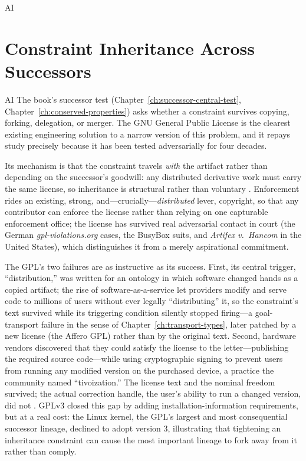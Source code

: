 \begin{refsection}
\begin{authbar}{AI}
\end{authbar}
\authbarneedspace
\section{Constraint Inheritance Across Successors}
\label{sec:appm-constraint-inheritance}
\begin{authbar}{AI}
The book's successor test (Chapter~\ref{ch:successor-central-test}, Chapter~\ref{ch:conserved-properties}) asks whether a constraint survives copying, forking, delegation, or merger.
The GNU General Public License is the clearest existing engineering solution to a narrow version of this problem, and it repays study precisely because it has been tested adversarially for four decades.

Its mechanism is that the constraint travels \emph{with} the artifact rather than depending on the successor's goodwill: any distributed derivative work must carry the same license, so inheritance is structural rather than voluntary \autocite{kelty2008twobits,weber2004successopensource}.
Enforcement rides an existing, strong, and---crucially---\emph{distributed} lever, copyright, so that any contributor can enforce the license rather than relying on one capturable enforcement office; the license has survived real adversarial contact in court (the German \emph{gpl-violations.org} cases, the BusyBox suits, and \emph{Artifex v.\ Hancom} in the United States), which distinguishes it from a merely aspirational commitment.

The GPL's two failures are as instructive as its success.
First, its central trigger, ``distribution,'' was written for an ontology in which software changed hands as a copied artifact; the rise of software-as-a-service let providers modify and serve code to millions of users without ever legally ``distributing'' it, so the constraint's text survived while its triggering condition silently stopped firing---a goal-transport failure in the sense of Chapter~\ref{ch:transport-types}, later patched by a new license (the Affero GPL) rather than by the original text. Second, hardware vendors discovered that they could satisfy the license to the letter---publishing the required source code---while using cryptographic signing to prevent users from running any modified version on the purchased device, a practice the community named ``tivoization.'' The license text and the nominal freedom survived; the actual correction handle, the user's ability to run a changed version, did not \autocite{fsf2007gplv3}. GPLv3 closed this gap by adding installation-information requirements, but at a real cost: the Linux kernel, the GPL's largest and most consequential successor lineage, declined to adopt version 3, illustrating that tightening an inheritance constraint can cause the most important lineage to fork away from it rather than comply.


\end{authbar}
\end{refsection}
